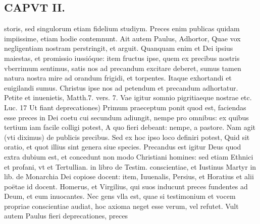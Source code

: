 \documentclass{article}
\begin{document}
\begin{pages}
\section*{CAPVT  II. }
\marginpar{[ p.4I ]}\pstart storis, sed singulorum etiam fidelium studiym. Preces enim publicas quidam impiissime, etiam hodie contemnunt. Ait autem Paulus, Adhortor, Quae vox negligentiam nostram perstringit, et arguit. Quanquam enim et Dei ipsius maiestas, et promissio iussióque: item fructus ipse, quem ex precibus nostris vberrimum sentimus, satis nos ad precandum excitare deberet, sumus tamen natura nostra mire ad orandum frigidi, et torpentes. Itaque exhortandi et euigilandi sumus. Christus ipse nos ad petendum et precandum adhortatur. Petite et inuenietis, Matth.7. vers. 7. Vae igitur somnio pigritiaeque nostrae etc. Luc. 17 Ut fiant deprecationes) Primum praeceptum ponit quod est, faciendas esse preces in Dei coetu cui secundum adiungit, nempe pro omnibus: ex quibus tertium iam facile colligi potest, A quo fieri debeant: nempe, a pastore. Nam agit (vti diximus) de publicis precibus. Sed ex hoc ipso loco definiri potest, Quid sit oratio, et quot illius sint genera siue species. Precandus est igitur Deus quod extra dubium est, et concedunt non modo Christiani homines: sed etiam Ethnici et profani, vt et Tertullian. in libro de Testim. conscientiae, et Iustinus Martyr in lib.  de Monarchia Dei copiose docent: item, Iuuenalis, Persius, et Horatius et alii poëtae id docent. Homerus, et Virgilius, qui suos inducunt preces fundentes ad Deum, et eum inuocantes. Nec gens vlla est, quae si testimonium et vocem propriae conscientiae audiat, hoc axioma neget esse verum, vel refutet. Vult autem Paulus fieri deprecationes, preces  \pend

\end{pages}
\end{document}

